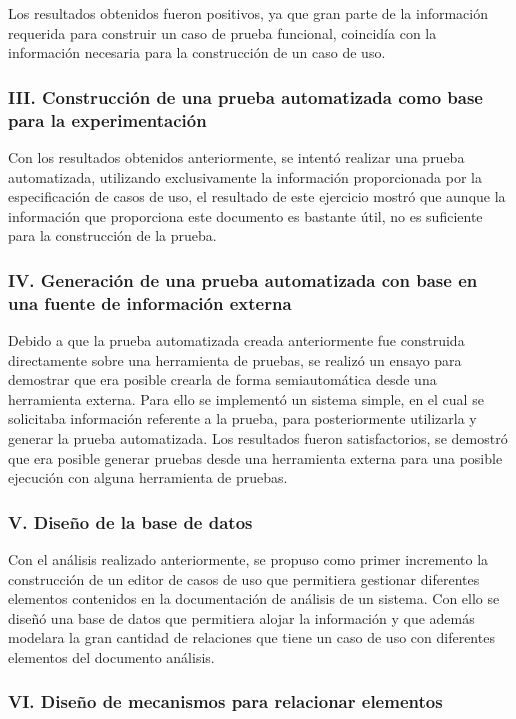 	Los resultados obtenidos fueron positivos, ya que gran parte de la información requerida para construir un caso de prueba funcional, coincidía con la información necesaria para la construcción de un caso de uso.

\subsubsection*{III. Construcción de una prueba automatizada como base para la experimentación}

	Con los resultados obtenidos anteriormente, se intentó realizar una prueba automatizada, utilizando exclusivamente la información proporcionada por la especificación de casos de uso, el resultado de este ejercicio mostró que aunque la información que proporciona este documento es bastante útil, no es suficiente para la construcción de la prueba.
		
\subsubsection*{IV. Generación de una prueba automatizada con base en una fuente de información externa}
	
	Debido a que la prueba automatizada creada anteriormente fue construida directamente sobre una herramienta de pruebas, se realizó un ensayo para demostrar que era posible crearla de forma semiautomática desde una herramienta externa. Para ello se implementó un sistema simple, en el cual se solicitaba información referente a la prueba, para posteriormente utilizarla y generar la prueba automatizada. Los resultados fueron satisfactorios, se demostró que era posible generar pruebas desde una herramienta externa para una posible ejecución con alguna herramienta de pruebas.
		
\subsubsection*{V. Diseño de la base de datos}

	Con el análisis realizado anteriormente, se propuso como primer incremento la construcción de un editor de casos de uso que permitiera gestionar diferentes elementos contenidos en la documentación de análisis de un sistema. Con ello se diseñó una base de datos que permitiera alojar la información y que además modelara la gran cantidad de relaciones que tiene un caso de uso con diferentes elementos del documento análisis.
			
\subsubsection*{VI. Diseño de mecanismos para relacionar elementos}

